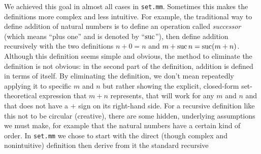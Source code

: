 We achieved this goal in almost all cases in \texttt{set.mm}.
Sometimes this makes the definitions more complex and less
intuitive.  For example, the traditional way to define addition of
natural numbers is to define an operation called {\em
successor} (which means ``plus one'' and is denoted by
``${\rm suc}$''), then define addition recursively with the two definitions $n + 0 = n$ and $m + {\rm suc}\,n =
{\rm suc} (m + n)$.  Although this definition seems simple and obvious,
the method to eliminate the definition is not obvious:  in the second
part of the definition, addition is defined in terms of itself.  By
eliminating the definition, we don't mean repeatedly applying it to
specific $m$ and $n$ but rather showing the explicit, closed-form
set-theoretical expression that $m + n$ represents, that will work for
any $m$ and $n$ and that does not have a $+$ sign on its right-hand
side.  For a recursive definition like this not to be circular
(creative), there are some hidden, underlying assumptions we must make,
for example that the natural numbers have a certain kind of order.  In
\texttt{set.mm} we chose to start with the direct (though complex and
nonintuitive) definition then derive from it the standard recursive
